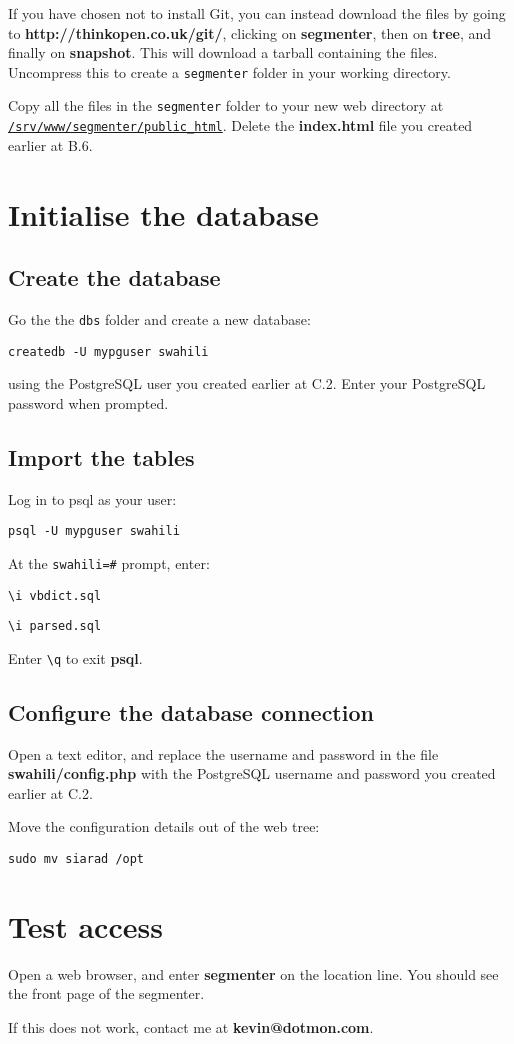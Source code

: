 \documentclass[a4paper,10pt]{article}
\begin{document}
If you have chosen not to install Git, you can instead download the files by going to \textbf{http://thinkopen.co.uk/git/}, clicking on \textbf{segmenter}, then on \textbf{tree}, and finally on \textbf{snapshot}.  This will download a tarball containing the files.  Uncompress this to create a \texttt{segmenter} folder in your working directory.

Copy all the files in the \texttt{segmenter} folder to your new web directory at \texttt{\url{/srv/www/segmenter/public_html}}.  Delete the \textbf{index.html} file you created earlier at B.6.

\section{Initialise the database}

\subsection{Create the database}

Go the the \texttt{dbs} folder and create a new database:

\texttt{createdb -U mypguser swahili}

using the PostgreSQL user you created earlier at C.2.  Enter your PostgreSQL password when prompted.

\subsection{Import the tables}

Log in to psql as your user:

\texttt{psql -U mypguser swahili}

At the \verb|swahili=#| prompt, enter:

\verb|\i vbdict.sql|

\verb|\i parsed.sql|

Enter \verb|\q| to exit \textbf{psql}.

\subsection{Configure the database connection}

Open a text editor, and replace the username and password in the file \textbf{swahili/config.php} with the PostgreSQL username and password you created earlier at C.2.

Move the configuration details out of the web tree:

\texttt{sudo mv siarad /opt}

\section{Test access}

Open a web browser, and enter \textbf{segmenter} on the location line.  You should see the front page of the segmenter.

If this does not work, contact me at \textbf{kevin@dotmon.com}.
\end{document}
